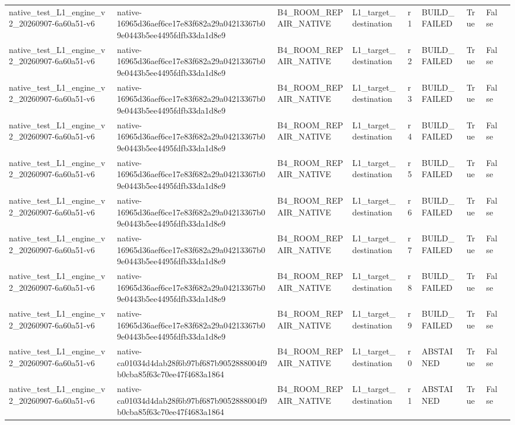 \begin{tabular}{lllllllll}
native\_test\_L1\_engine\_v2\_20260907-6a60a51-v6 & native-16965d36aef6ce17e83f682a29a04213367b09e0443b5ee4495fdfb33da1d8e9 & B4\_ROOM\_REPAIR\_NATIVE & L1\_target\_destination & r1 & BUILD\_FAILED & True & False &  \\
native\_test\_L1\_engine\_v2\_20260907-6a60a51-v6 & native-16965d36aef6ce17e83f682a29a04213367b09e0443b5ee4495fdfb33da1d8e9 & B4\_ROOM\_REPAIR\_NATIVE & L1\_target\_destination & r2 & BUILD\_FAILED & True & False &  \\
native\_test\_L1\_engine\_v2\_20260907-6a60a51-v6 & native-16965d36aef6ce17e83f682a29a04213367b09e0443b5ee4495fdfb33da1d8e9 & B4\_ROOM\_REPAIR\_NATIVE & L1\_target\_destination & r3 & BUILD\_FAILED & True & False &  \\
native\_test\_L1\_engine\_v2\_20260907-6a60a51-v6 & native-16965d36aef6ce17e83f682a29a04213367b09e0443b5ee4495fdfb33da1d8e9 & B4\_ROOM\_REPAIR\_NATIVE & L1\_target\_destination & r4 & BUILD\_FAILED & True & False &  \\
native\_test\_L1\_engine\_v2\_20260907-6a60a51-v6 & native-16965d36aef6ce17e83f682a29a04213367b09e0443b5ee4495fdfb33da1d8e9 & B4\_ROOM\_REPAIR\_NATIVE & L1\_target\_destination & r5 & BUILD\_FAILED & True & False &  \\
native\_test\_L1\_engine\_v2\_20260907-6a60a51-v6 & native-16965d36aef6ce17e83f682a29a04213367b09e0443b5ee4495fdfb33da1d8e9 & B4\_ROOM\_REPAIR\_NATIVE & L1\_target\_destination & r6 & BUILD\_FAILED & True & False &  \\
native\_test\_L1\_engine\_v2\_20260907-6a60a51-v6 & native-16965d36aef6ce17e83f682a29a04213367b09e0443b5ee4495fdfb33da1d8e9 & B4\_ROOM\_REPAIR\_NATIVE & L1\_target\_destination & r7 & BUILD\_FAILED & True & False &  \\
native\_test\_L1\_engine\_v2\_20260907-6a60a51-v6 & native-16965d36aef6ce17e83f682a29a04213367b09e0443b5ee4495fdfb33da1d8e9 & B4\_ROOM\_REPAIR\_NATIVE & L1\_target\_destination & r8 & BUILD\_FAILED & True & False &  \\
native\_test\_L1\_engine\_v2\_20260907-6a60a51-v6 & native-16965d36aef6ce17e83f682a29a04213367b09e0443b5ee4495fdfb33da1d8e9 & B4\_ROOM\_REPAIR\_NATIVE & L1\_target\_destination & r9 & BUILD\_FAILED & True & False &  \\
native\_test\_L1\_engine\_v2\_20260907-6a60a51-v6 & native-ca01034d4dab28f6b97bf687b9052888004f9b0cba85f63c70ee47f4683a1864 & B4\_ROOM\_REPAIR\_NATIVE & L1\_target\_destination & r0 & ABSTAINED & True & False &  \\
native\_test\_L1\_engine\_v2\_20260907-6a60a51-v6 & native-ca01034d4dab28f6b97bf687b9052888004f9b0cba85f63c70ee47f4683a1864 & B4\_ROOM\_REPAIR\_NATIVE & L1\_target\_destination & r1 & ABSTAINED & True & False &  \\

\end{tabular}
